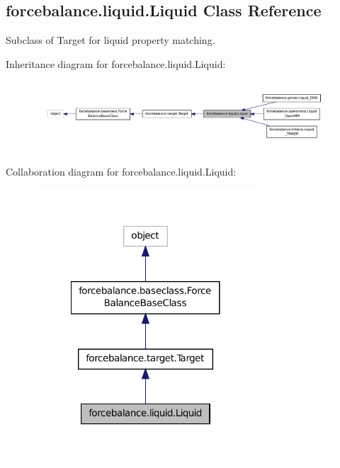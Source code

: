 \hypertarget{classforcebalance_1_1liquid_1_1Liquid}{\subsection{forcebalance.\-liquid.\-Liquid Class Reference}
\label{classforcebalance_1_1liquid_1_1Liquid}
}


Subclass of Target for liquid property matching.  




Inheritance diagram for forcebalance.\-liquid.\-Liquid\-:
\nopagebreak
\begin{figure}[H]
\begin{center}
\leavevmode
\includegraphics[width=350pt]{classforcebalance_1_1liquid_1_1Liquid__inherit__graph}
\end{center}
\end{figure}


Collaboration diagram for forcebalance.\-liquid.\-Liquid\-:
\nopagebreak
\begin{figure}[H]
\begin{center}
\leavevmode
\includegraphics[width=236pt]{classforcebalance_1_1liquid_1_1Liquid__coll__graph}
\end{center}
\end{figure}
